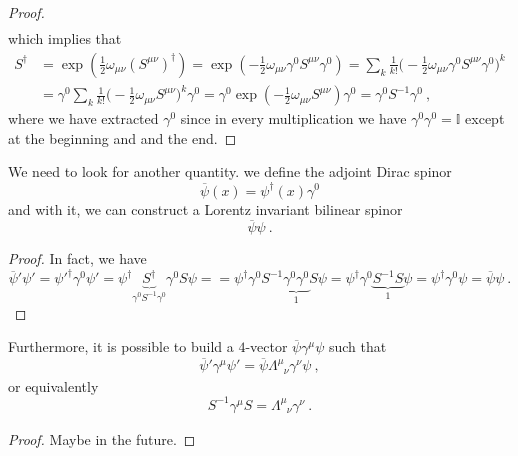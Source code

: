 \begin{proof}
\begin{equation*}
\begin{aligned}
        \end{aligned}
        \end{equation*}
        which implies that
        \begin{equation*}
        \begin{aligned}
            S^\dagger & = \exp ( \frac{1}{2} \omega_{\mu\nu} (S^{\mu\nu})^\dagger) = \exp ( - \frac{1}{2} \omega_{\mu\nu} \gamma^0 S^{\mu\nu} \gamma^0) = \sum_k \frac{1}{k!} \Big (- \frac{1}{2} \omega_{\mu\nu} \gamma^0 S^{\mu\nu} \gamma^0 \Big)^k \\ & = \gamma^0 \sum_k \frac{1}{k!} \Big (- \frac{1}{2} \omega_{\mu\nu} S^{\mu\nu} \Big)^k \gamma^0 = \gamma^0 \exp ( - \frac{1}{2} \omega_{\mu\nu} S^{\mu\nu}) \gamma^0 = \gamma^0 S^{-1} \gamma^0 ~,
        \end{aligned}
        \end{equation*}
        where we have extracted $\gamma^0$ since in every multiplication we have $\gamma^0 \gamma^0 = \mathbb I$ except at the beginning and and the end.
    \end{proof}

    We need to look for another quantity. we define the adjoint Dirac spinor 
    \begin{equation*}
        \overline \psi (x) = \psi^\dagger (x) \gamma^0 
    \end{equation*}
    and with it, we can construct a Lorentz invariant bilinear spinor 
    \begin{equation*}
        \overline \psi \psi ~.
    \end{equation*}
    \begin{proof}
        In fact, we have
        \begin{equation*}
            \overline \psi' \psi' = {\psi'}^\dagger \gamma^0 \psi' = \psi^\dagger \underbrace{S^\dagger}_{\gamma^0 S^{-1} \gamma^0} \gamma^0 S \psi = = \psi^\dagger \gamma^0 S^{-1} \underbrace{\gamma^0 \gamma^0}_1 S \psi = \psi^\dagger \gamma^0 \underbrace{S^{-1} S}_1 \psi = \psi^\dagger \gamma^0 \psi = \overline \psi \psi ~.
        \end{equation*}
    \end{proof}

    Furthermore, it is possible to build a $4$-vector $\overline \psi \gamma^\mu \psi$ such that
    \begin{equation*}
        \overline \psi' \gamma^\mu \psi' = \overline \psi \Lambda^\mu_{\phantom \mu \nu} \gamma^\nu \psi ~,
    \end{equation*}
    or equivalently 
    \begin{equation*}
        S^{-1} \gamma^\mu S = \Lambda^\mu_{\phantom \mu \nu} \gamma^\nu ~.
    \end{equation*}
    \begin{proof}
        Maybe in the future.
    \end{proof}

